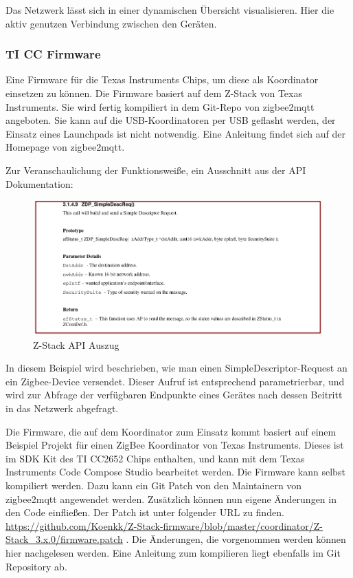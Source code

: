 Das Netzwerk lässt sich in einer dynamischen Übersicht visualisieren. Hier die aktiv genutzen Verbindung zwischen den Geräten. 


\subsubsection{TI CC Firmware}

Eine Firmware für die Texas Instruments Chips, um diese als Koordinator einsetzen zu können. Die Firmware basiert auf dem Z-Stack von Texas Instruments. Sie wird fertig kompiliert
in dem Git-Repo von zigbee2mqtt angeboten. Sie kann auf die USB-Koordinatoren per USB geflasht werden, der Einsatz eines Launchpads ist nicht notwendig. Eine Anleitung
findet sich auf der Homepage von zigbee2mqtt.  


Zur Veranschaulichung der Funktionsweiße, ein Ausschnitt aus der API Dokumentation:

\begin{figure}[H]
  \centering
  \includegraphics[width=1\textwidth]{media/z-stack-api-excerpt.png}
  \caption{Z-Stack API Auszug}
\end{figure}

In diesem Beispiel wird beschrieben, wie man einen SimpleDescriptor-Request an ein Zigbee-Device versendet. Dieser Aufruf ist entsprechend parametrierbar,
und wird zur Abfrage der verfügbaren Endpunkte eines Gerätes nach dessen Beitritt in das Netzwerk abgefragt.

Die Firmware, die auf dem Koordinator zum Einsatz kommt basiert auf einem Beispiel Projekt für einen ZigBee Koordinator von Texas Instruments. Dieses ist
im SDK Kit des TI CC2652 Chips enthalten, und kann mit dem Texas Instruments Code Compose Studio bearbeitet werden. Die Firmware kann selbst kompiliert werden.
Dazu kann ein Git Patch von den Maintainern von zigbee2mqtt angewendet werden. Zusätzlich können nun eigene Änderungen in den Code einfließen. Der Patch ist unter
folgender URL zu finden.
\url{https://github.com/Koenkk/Z-Stack-firmware/blob/master/coordinator/Z-Stack_3.x.0/firmware.patch} .
Die Änderungen, die vorgenommen werden können hier nachgelesen werden. Eine Anleitung zum kompilieren liegt ebenfalls im Git Repository ab.


